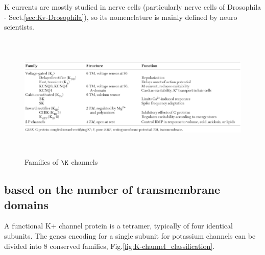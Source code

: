 K currents are mostly studied in nerve cells (particularly nerve cells of
Drosophila - Sect.\ref{sec:Kv-Drosophila}), so its nomenclature is mainly
defined by neuro scientists.


\begin{figure}[htb]
  \centerline{\includegraphics[height=6cm]{./images/K+-channels.eps}}
  \caption{Families of $\K$ channels}
  \label{fig:K+-channel-families}
\end{figure}



\subsection{based on the number of transmembrane domains}
\label{sec:nomenclature-K_channel-based-number-TM}

A functional K+ channel protein is a tetramer, typically of four identical
subunits.  The genes encoding for a single subunit for potassium channels can be
divided into 8 conserved families, Fig.\ref{fig:K-channel_classification}.
 
